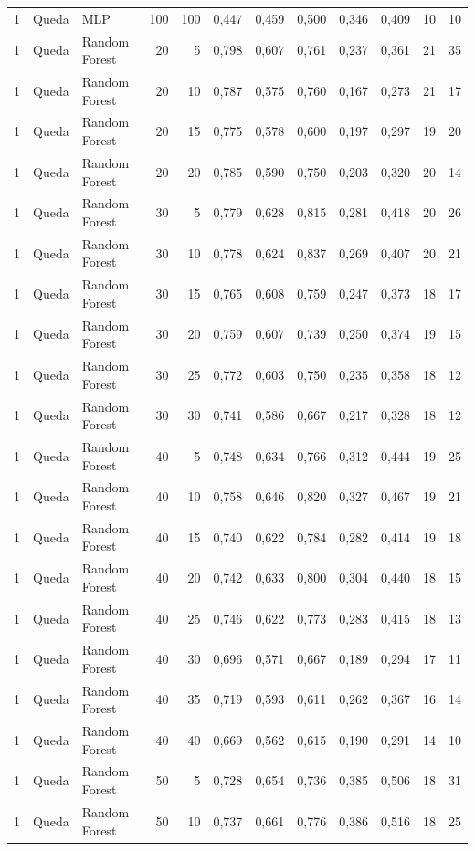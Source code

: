 \begin{longtable}{@{}rllrrrrrrrrr@{}}
1 & Queda & MLP & 100 & 100 & 0,447 & 0,459 & 0,500 & 0,346 & 0,409 & 10 & 10 \\
1 & Queda & Random Forest & 20 & 5 & 0,798 & 0,607 & 0,761 & 0,237 & 0,361 & 21 & 35 \\
1 & Queda & Random Forest & 20 & 10 & 0,787 & 0,575 & 0,760 & 0,167 & 0,273 & 21 & 17 \\
1 & Queda & Random Forest & 20 & 15 & 0,775 & 0,578 & 0,600 & 0,197 & 0,297 & 19 & 20 \\
1 & Queda & Random Forest & 20 & 20 & 0,785 & 0,590 & 0,750 & 0,203 & 0,320 & 20 & 14 \\
1 & Queda & Random Forest & 30 & 5 & 0,779 & 0,628 & 0,815 & 0,281 & 0,418 & 20 & 26 \\
1 & Queda & Random Forest & 30 & 10 & 0,778 & 0,624 & 0,837 & 0,269 & 0,407 & 20 & 21 \\
1 & Queda & Random Forest & 30 & 15 & 0,765 & 0,608 & 0,759 & 0,247 & 0,373 & 18 & 17 \\
1 & Queda & Random Forest & 30 & 20 & 0,759 & 0,607 & 0,739 & 0,250 & 0,374 & 19 & 15 \\
1 & Queda & Random Forest & 30 & 25 & 0,772 & 0,603 & 0,750 & 0,235 & 0,358 & 18 & 12 \\
1 & Queda & Random Forest & 30 & 30 & 0,741 & 0,586 & 0,667 & 0,217 & 0,328 & 18 & 12 \\
1 & Queda & Random Forest & 40 & 5 & 0,748 & 0,634 & 0,766 & 0,312 & 0,444 & 19 & 25 \\
1 & Queda & Random Forest & 40 & 10 & 0,758 & 0,646 & 0,820 & 0,327 & 0,467 & 19 & 21 \\
1 & Queda & Random Forest & 40 & 15 & 0,740 & 0,622 & 0,784 & 0,282 & 0,414 & 19 & 18 \\
1 & Queda & Random Forest & 40 & 20 & 0,742 & 0,633 & 0,800 & 0,304 & 0,440 & 18 & 15 \\
1 & Queda & Random Forest & 40 & 25 & 0,746 & 0,622 & 0,773 & 0,283 & 0,415 & 18 & 13 \\
1 & Queda & Random Forest & 40 & 30 & 0,696 & 0,571 & 0,667 & 0,189 & 0,294 & 17 & 11 \\
1 & Queda & Random Forest & 40 & 35 & 0,719 & 0,593 & 0,611 & 0,262 & 0,367 & 16 & 14 \\
1 & Queda & Random Forest & 40 & 40 & 0,669 & 0,562 & 0,615 & 0,190 & 0,291 & 14 & 10 \\
1 & Queda & Random Forest & 50 & 5 & 0,728 & 0,654 & 0,736 & 0,385 & 0,506 & 18 & 31 \\
1 & Queda & Random Forest & 50 & 10 & 0,737 & 0,661 & 0,776 & 0,386 & 0,516 & 18 & 25 \\

\end{longtable}
